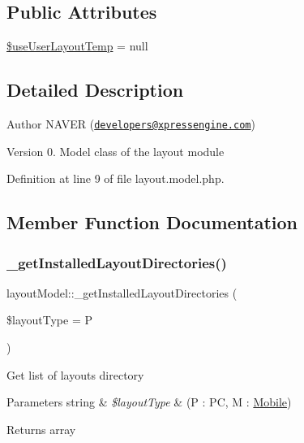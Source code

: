 \subsection*{Public Attributes}
\begin{DoxyCompactItemize}
\item 
\hyperlink{classlayoutModel_a51f307edec8ca62a4cbaffb4833b2d20}{\$use\+User\+Layout\+Temp} = null
\end{DoxyCompactItemize}


\subsection{Detailed Description}
\begin{DoxyAuthor}{Author}
N\+A\+V\+ER (\href{mailto:developers@xpressengine.com}{\tt developers@xpressengine.\+com}) 
\end{DoxyAuthor}
\begin{DoxyVersion}{Version}
0. Model class of the layout module 
\end{DoxyVersion}


Definition at line 9 of file layout.\+model.\+php.



\subsection{Member Function Documentation}
\mbox{\label{classlayoutModel_a326452abcba753f4bc8eb689909dc182}} 
\subsubsection{\texorpdfstring{\+\_\+get\+Installed\+Layout\+Directories()}{\_getInstalledLayoutDirectories()}}
{\footnotesize\ttfamily layout\+Model\+::\+\_\+get\+Installed\+Layout\+Directories (\begin{DoxyParamCaption}\item[{}]{\$layout\+Type = {\ttfamily \textquotesingle{}P\textquotesingle{}} }\end{DoxyParamCaption})}

Get list of layouts directory 
\begin{DoxyParams}[1]{Parameters}
string & {\em \$layout\+Type} & (P \+: PC, M \+: \hyperlink{classMobile}{Mobile}) \\
\hline
\end{DoxyParams}
\begin{DoxyReturn}{Returns}
array 
\end{DoxyReturn}



